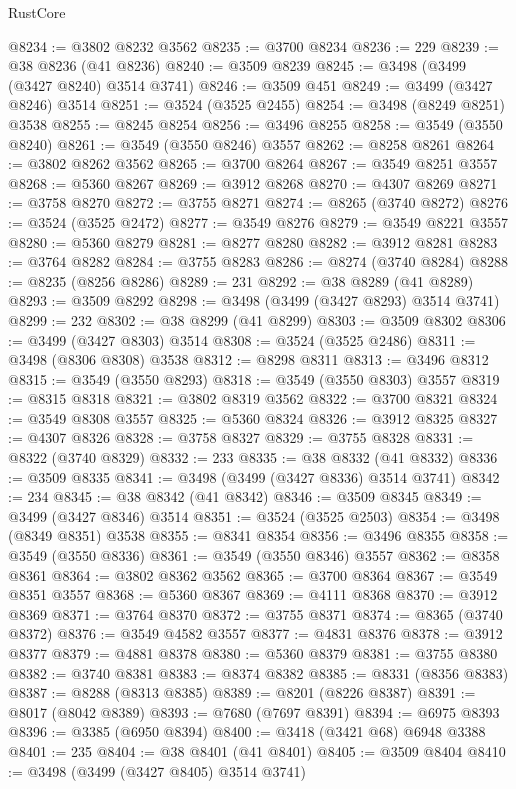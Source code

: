 \begin{lexlean}{RustCore}
\begin{coremodule}
@8234 := @3802 @8232 @3562
@8235 := @3700 @8234
@8236 := 229
@8239 := @38 @8236 (@41 @8236)
@8240 := @3509 @8239
@8245 := @3498 (@3499 (@3427 @8240) @3514 @3741)
@8246 := @3509 @451
@8249 := @3499 (@3427 @8246) @3514
@8251 := @3524 (@3525 @2455)
@8254 := @3498 (@8249 @8251) @3538
@8255 := @8245 @8254
@8256 := @3496 @8255
@8258 := @3549 (@3550 @8240)
@8261 := @3549 (@3550 @8246) @3557
@8262 := @8258 @8261
@8264 := @3802 @8262 @3562
@8265 := @3700 @8264
@8267 := @3549 @8251 @3557
@8268 := @5360 @8267
@8269 := @3912 @8268
@8270 := @4307 @8269
@8271 := @3758 @8270
@8272 := @3755 @8271
@8274 := @8265 (@3740 @8272)
@8276 := @3524 (@3525 @2472)
@8277 := @3549 @8276
@8279 := @3549 @8221 @3557
@8280 := @5360 @8279
@8281 := @8277 @8280
@8282 := @3912 @8281
@8283 := @3764 @8282
@8284 := @3755 @8283
@8286 := @8274 (@3740 @8284)
@8288 := @8235 (@8256 @8286)
@8289 := 231
@8292 := @38 @8289 (@41 @8289)
@8293 := @3509 @8292
@8298 := @3498 (@3499 (@3427 @8293) @3514 @3741)
@8299 := 232
@8302 := @38 @8299 (@41 @8299)
@8303 := @3509 @8302
@8306 := @3499 (@3427 @8303) @3514
@8308 := @3524 (@3525 @2486)
@8311 := @3498 (@8306 @8308) @3538
@8312 := @8298 @8311
@8313 := @3496 @8312
@8315 := @3549 (@3550 @8293)
@8318 := @3549 (@3550 @8303) @3557
@8319 := @8315 @8318
@8321 := @3802 @8319 @3562
@8322 := @3700 @8321
@8324 := @3549 @8308 @3557
@8325 := @5360 @8324
@8326 := @3912 @8325
@8327 := @4307 @8326
@8328 := @3758 @8327
@8329 := @3755 @8328
@8331 := @8322 (@3740 @8329)
@8332 := 233
@8335 := @38 @8332 (@41 @8332)
@8336 := @3509 @8335
@8341 := @3498 (@3499 (@3427 @8336) @3514 @3741)
@8342 := 234
@8345 := @38 @8342 (@41 @8342)
@8346 := @3509 @8345
@8349 := @3499 (@3427 @8346) @3514
@8351 := @3524 (@3525 @2503)
@8354 := @3498 (@8349 @8351) @3538
@8355 := @8341 @8354
@8356 := @3496 @8355
@8358 := @3549 (@3550 @8336)
@8361 := @3549 (@3550 @8346) @3557
@8362 := @8358 @8361
@8364 := @3802 @8362 @3562
@8365 := @3700 @8364
@8367 := @3549 @8351 @3557
@8368 := @5360 @8367
@8369 := @4111 @8368
@8370 := @3912 @8369
@8371 := @3764 @8370
@8372 := @3755 @8371
@8374 := @8365 (@3740 @8372)
@8376 := @3549 @4582 @3557
@8377 := @4831 @8376
@8378 := @3912 @8377
@8379 := @4881 @8378
@8380 := @5360 @8379
@8381 := @3755 @8380
@8382 := @3740 @8381
@8383 := @8374 @8382
@8385 := @8331 (@8356 @8383)
@8387 := @8288 (@8313 @8385)
@8389 := @8201 (@8226 @8387)
@8391 := @8017 (@8042 @8389)
@8393 := @7680 (@7697 @8391)
@8394 := @6975 @8393
@8396 := @3385 (@6950 @8394)
@8400 := @3418 (@3421 @68) @6948 @3388
@8401 := 235
@8404 := @38 @8401 (@41 @8401)
@8405 := @3509 @8404
@8410 := @3498 (@3499 (@3427 @8405) @3514 @3741)

\end{coremodule}
\end{lexlean}
